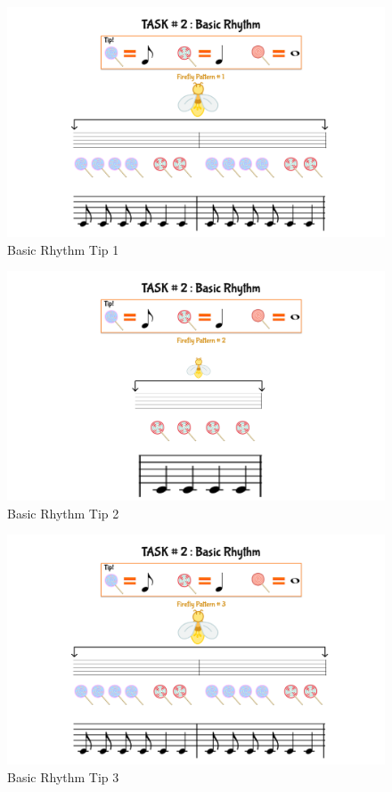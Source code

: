 \begin{figure}[H]
    \centering
    \includegraphics[width=12cm]{figures/NewFigures/BasicRhythmTip1.png}
    \caption{Basic Rhythm Tip 1}
    \label{fig:BasicRhythmTip1}
\end{figure}

\begin{figure}[H]
    \centering
    \includegraphics[width=15cm]{figures/NewFigures/BasicRhythmTip2.png}
    \caption{Basic Rhythm Tip 2}
    \label{fig:BasicRhythmTip2}
\end{figure}

\begin{figure}[H]
    \centering
    \includegraphics[width=15cm]{figures/NewFigures/BasicRhythmTip3.png}
    \caption{Basic Rhythm Tip 3}
    \label{fig:BasicRhythmTip3}
\end{figure}

